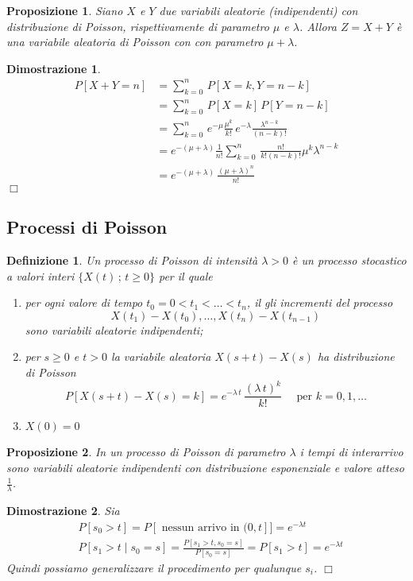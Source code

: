 \documentclass{article}
\newtheorem{definizione}{Definizione}[section]
\newtheorem{proposizione}{Proposizione}[section]
\newtheorem*{dimostrazione*}{Dimostrazione}
\newcommand*{\QED}{\hfill\ensuremath{\Box}}
\begin{document}
\begin{proposizione}
\label{pp_somma_due_poisson}
Siano $X$ e $Y$ due variabili aleatorie (indipendenti) con distribuzione di Poisson, rispettivamente di parametro $\mu$ e $\lambda$. Allora $Z = X + Y$ è una variabile aleatoria di Poisson con con parametro $\mu + \lambda$.
\end{proposizione}
\begin{dimostrazione*}
\begin{align*}
P[X + Y = n] &= \sum_{k=0}^n\,P[X=k,Y=n-k]\\
&= \sum_{k=0}^n\,P[X = k]\,P[Y = n-k]\\
&= \sum_{k = 0}^n\,e^{-\mu}\frac{\mu^k}{k!}\,e^{-\lambda}\frac{\lambda^{n-k}}{(n-k)!}\\
&= e^{-(\mu+\lambda)}\frac{1}{n!}\sum_{k=0}^n\,\frac{n!}{k!(n-k)!}\mu^k\lambda^{n-k}\\
&= e^{-(\mu+\lambda)}\,\frac{(\mu+\lambda)^n}{n!}
\end{align*}
\QED
\end{dimostrazione*}

\subsection{Processi di Poisson}

\begin{definizione}
Un processo di Poisson di intensità $\lambda > 0$ è un processo stocastico a valori interi $\{X(t)\,;\,t \ge 0\}$ per il quale
\begin{enumerate}
    \item per ogni valore di tempo $t_0 = 0 < t_1 < \hdots < t_n$, il gli incrementi del processo
    $$
    X(t_1) - X(t_0), \hdots, X(t_n) - X(t_{n-1})
    $$
    sono variabili aleatorie indipendenti;
    \item per $s \ge 0$ e $t > 0$ la variabile aleatoria $X(s+t) - X(s)$ ha distribuzione di Poisson
    $$
    P[X(s+t) - X(s) = k] = e^{-\lambda\,t}\,\frac{(\lambda\,t)^k}{k!} \quad \text{ per } k=0,1,\hdots
    $$
    \item $X(0) = 0$
\end{enumerate}
\end{definizione}

\begin{proposizione}
\label{pp_tempi_interarrivo}
In un processo di Poisson di parametro $\lambda$ i tempi di interarrivo sono variabili aleatorie indipendenti con distribuzione esponenziale e valore atteso $\frac{1}{\lambda}$.
\end{proposizione}
\begin{dimostrazione*}
Sia
\begin{align*}
&P[s_0 > t] = P[\text{ nessun arrivo in }(0,t]] = e^{-\lambda t}\\
&P[s_1 > t\mid s_0 = s] = \frac{P[s_1 > t, s_0 = s]}{P[s_0 = s]} = P[s_1 > t] = e^{-\lambda t}
\end{align*}
Quindi possiamo generalizzare il procedimento per qualunque $s_i$. 
\QED
\end{dimostrazione*}
\end{document}
